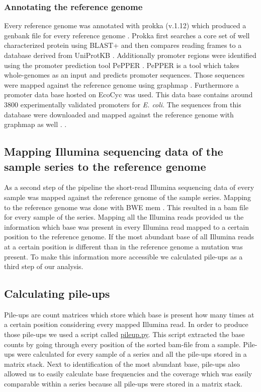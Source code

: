 \subsubsection{Annotating the reference genome}
Every reference genome was annotated with prokka (v.1.12) which produced a genbank file for every reference genome \cite{seemann_prokka:_2014}. Prokka first searches a core set of well characterized protein using BLAST+ and then compares reading frames to a database derived from UniProtKB \cite{seemann_:zap:_2019}. Additionally promoter regions were identified using the promoter prediction tool PePPER \cite{pepper}. PePPER is a tool which takes whole-genomes as an input and predicts promoter sequences. Those sequences were mapped against the reference genome using graphmap \cite{sovic_fast_2016}. Furthermore a promoter data base hosted on EcoCyc was used. This data base contains around 3800 experimentally validated promoters for \textit{E. coli}\cite{noauthor_smarttable_nodate}. The sequences from this database were downloaded and mapped against the reference genome with graphmap as well \cite{sovic_fast_2016}. 
\label{section:annotatiion_ref}.


\subsection{Mapping Illumina sequencing data of the sample series to the reference genome}
As a second step of the pipeline the short-read Illumina sequencing data of every sample was mapped against the reference genome of the sample series. Mapping to the reference genome was done with BWE mem \cite{li_fast_2009}. This resulted in a bam file for every sample of the series. Mapping all the Illumina reads provided us the information which base was present in every Illumina read mapped to a certain position to the reference genome. If the most abundant base of all Illumina reads at a certain position is different than in the reference genome a mutation was present. To make this information more accessible we calculated pile-ups as a third step of our analysis. 

\subsection{Calculating pile-ups}
Pile-ups are count matrices which store which base is present how many times at a certain position considering every mapped Illumina read. In order to produce those pile-ups we used a script called \href{https://github.com/nahanoo/ESBL\_project/pileup.py}{pileup.py}. This script extracted the base counts by going through every position of the sorted bam-file from a sample. Pile-ups were calculated for every sample of a series and all the pile-ups stored in a matrix stack. Next to identification of the most abundant base, pile-ups also allowed us to easily calculate base frequencies and the coverage which was easily comparable within a series because all pile-ups were stored in a matrix stack.

